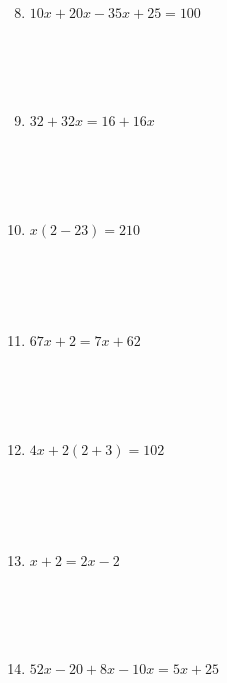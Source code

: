 \documentclass{article}
\begin{document}
\begin{minipage}[t]{0.45\textwidth}
    \begin{enumerate}
        \setcounter{enumi}{7} %
        \item $ 10x + 20x - 35x + 25 = 100 $
        \\\\\\\\\\
        \item $ 32 + 32x = 16 + 16x $
        \\\\\\\\\\
        \item $ x(2-23) = 210 $
        \\\\\\\\\\
        \item $ 67x + 2 = 7x + 62$
        \\\\\\\\\\
        \item $ 4x + 2(2+3) = 102$
        \\\\\\\\\\
        \item $ x + 2 = 2x-2$
        \\\\\\\\\\
        \item $ 52x - 20 + 8x - 10x = 5x + 25$
    \end{enumerate}
\end{minipage}
\end{document}
